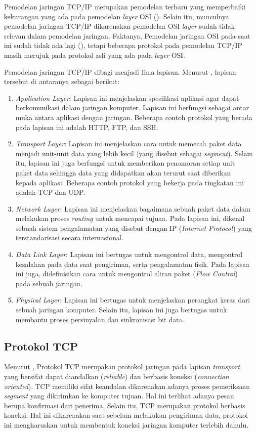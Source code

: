 Pemodelan jaringan TCP/IP merupakan pemodelan terbaru yang memperbaiki kekurangan yang ada pada pemodelan \emph{layer} OSI (\cite{forouzan2012}). Selain itu, munculnya pemodelan jaringan TCP/IP dikarenakan pemodelan OSI \emph{layer} sudah tidak relevan dalam pemodelan jaringan. Faktanya, Pemodelan jaringan OSI pada saat ini sudah tidak ada lagi (\cite{odom2022}), tetapi beberapa protokol pada pemodelan TCP/IP masih merujuk pada protokol asli yang ada pada \emph{layer} OSI.

Pemodelan jaringan TCP/IP dibagi menjadi lima lapisan. Menurut \textcite{forouzan2012}, lapisan tersebut di antaranya sebagai berikut:

\begin{enumerate}
  \item \emph{Application Layer}: Lapisan ini menjelaskan spesifikasi aplikasi agar dapat berkomunikasi dalam jaringan komputer. Lapisan ini berfungsi sebagai antar muka antara aplikasi dengan jaringan. Beberapa contoh protokol yang berada pada lapisan ini adalah HTTP, FTP, dan SSH.
  \item \emph{Transport Layer}: Lapisan ini menjelaskan cara untuk memecah paket data menjadi unit-unit data yang lebih kecil (yang disebut sebagai \emph{segment}). Selain itu, lapisan ini juga berfungsi untuk memberikan penomoran setiap unit paket data sehingga data yang didapatkan akan terurut saat diberikan kepada aplikasi. Beberapa contoh protokol yang bekerja pada tingkatan ini adalah TCP dan UDP.
  \item \emph{Network Layer}: Lapisan ini menjelaskan bagaimana sebuah paket data dalam melakukan proses \emph{routing} untuk mencapai tujuan. Pada lapisan ini, dikenal sebuah sistem pengalamatan yang disebut dengan IP (\emph{Internet Protocol}) yang terstandarisasi secara internasional.
  \item \emph{Data Link Layer}: Lapisan ini bertugas untuk mengontrol data, mengontrol kesalahan pada data saat pengiriman, serta pengalamatan fisik. Pada lapisan ini juga, didefinisikan cara untuk mengontrol aliran paket (\emph{Flow Control}) pada sebuah jaringan.
  \item \emph{Physical Layer}: Lapisan ini bertugas untuk menjelaskan perangkat keras dari sebuah jaringan komputer. Selain itu, lapisan ini juga bertugas untuk membantu proses persinyalan dan sinkronisasi bit data.
\end{enumerate}

\subsection{Protokol TCP}
Menurut \textcite{pratama2015}, Protokol TCP merupakan protokol jaringan pada lapisan \emph{transport} yang bersifat dapat diandalkan (\emph{reliable}) dan berbasis koneksi (\emph{connection oriented}). TCP memiliki sifat keandalan dikarenakan adanya proses pemeriksaan \emph{segment} yang dikirimkan ke komputer tujuan. Hal ini terlihat adanya pesan berupa konfirmasi dari penerima. Selain itu, TCP merupakan protokol berbasis koneksi. Hal ini dikarenakan saat sebelum melakukan pengiriman data, protokol ini mengharuskan untuk membentuk koneksi jaringan komputer terlebih dahulu. 

